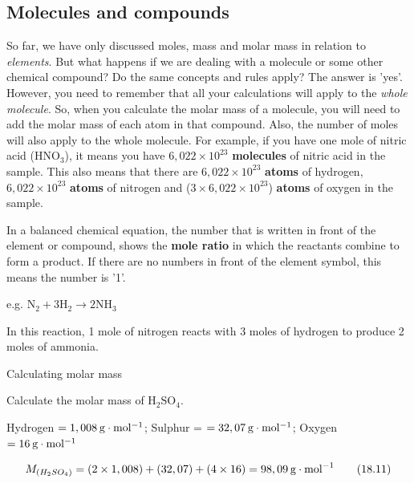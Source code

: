             \subsection{ Molecules and compounds}
            \nopagebreak
      \label{m38717*id278284}So far, we have only discussed moles, mass and molar mass in relation to \textsl{elements}. But what happens if we are dealing with a molecule or some other chemical compound? Do the same concepts and rules apply? The answer is 'yes'. However, you need to remember that all your calculations will apply to the \textsl{whole molecule}. So, when you calculate the molar mass of a molecule, you will need to add the molar mass of each atom in that compound. Also, the number of moles will also apply to the whole molecule. For example, if you have one mole of nitric acid ($\mathrm{HNO}{}_{3}$), it means you have $6,022\ensuremath{\times}{10}^{23}$ \textbf{molecules} of nitric acid in the sample. This also means that there are $6,022\ensuremath{\times}{10}^{23}$ \textbf{atoms} of hydrogen, $6,022\ensuremath{\times}{10}^{23}$ \textbf{atoms} of nitrogen and ($3\ensuremath{\times}6,022\ensuremath{\times}{10}^{23}$) \textbf{atoms} of oxygen in the sample.\par 
      \label{m38717*id278429}In a balanced chemical equation, the number that is written in front of the element or compound, shows the \textbf{mole ratio} in which the reactants combine to form a product. If there are no numbers in front of the element symbol, this means the number is '1'.\par 
      \label{m38717*id278442}e.g. ${\mathrm{N}}_{2}+3{\mathrm{H}}_{2}\to 2\mathrm{N}{\mathrm{H}}_{3}$\par 
      \label{m38717*id278488}In this reaction, 1 mole of nitrogen reacts with 3 moles of hydrogen to produce 2 moles of ammonia.\par 
\label{m38717*secfhsst!!!underscore!!!id566}\vspace{.5cm} 
      \begin{wex}{Calculating molar mass }{
      \label{m38717*probfhsst!!!underscore!!!id567}
      \label{m38717*id278505}Calculate the molar mass of $\mathrm{H}{}_{2}\mathrm{SO}{}_{4}$.\par 
      \vspace{5pt}}
{
      \label{m38717*id278575}Hydrogen $=1,008\phantom{\rule{2pt}{0ex}}\mathrm{g}\ensuremath{\cdot}\mathrm{mol}{}^{-1}$; Sulphur = $=32,07\phantom{\rule{2pt}{0ex}}\mathrm{g}\ensuremath{\cdot}\mathrm{mol}{}^{-1}$; Oxygen $=16\phantom{\rule{2pt}{0ex}}\mathrm{g}\ensuremath{\cdot}\mathrm{mol}{}^{-1}$\par 
      \label{m38717*id278632}\nopagebreak\noindent{}
    \begin{equation}
    {M}_{\left({H}_{2}S{O}_{4}\right)}=\left(2\ensuremath{\times}1,008\right)+\left(32,07\right)+\left(4\ensuremath{\times}16\right)=98,09\phantom{\rule{2pt}{0ex}}\mathrm{g}\ensuremath{\cdot}{\mathrm{mol}}^{-1}\tag{18.11}
      \end{equation}
}
    \end{wex}
